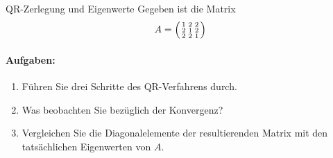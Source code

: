 \begin{example2}{QR-Zerlegung und Eigenwerte}
Gegeben ist die Matrix
$$A = \begin{psmallmatrix}
1 & 2 & 2\\
2 & 1 & 2\\
2 & 2 & 1
\end{psmallmatrix}$$

\paragraph{Aufgaben:}
\begin{enumerate}
    \item Führen Sie drei Schritte des QR-Verfahrens durch.
    
    \item Was beobachten Sie bezüglich der Konvergenz? 
    
    \item Vergleichen Sie die Diagonalelemente der resultierenden Matrix mit den tatsächlichen Eigenwerten von $A$.
\end{enumerate}
\end{example2}


